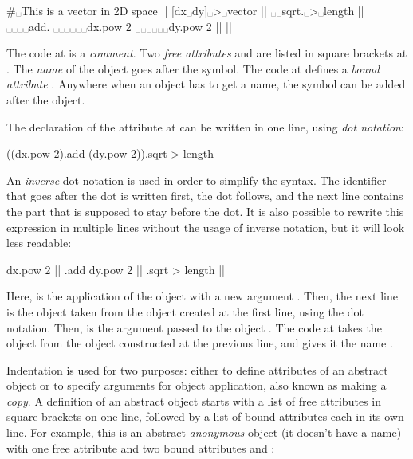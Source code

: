\begin{ffcode}
#␣This is a vector in 2D space |$\label{ln:comment}$|
[dx␣dy]␣>␣vector |$\label{ln:vector}$|
␣␣sqrt.␣>␣length |$\label{ln:length}$|
␣␣␣␣add.
␣␣␣␣␣␣dx.pow 2
␣␣␣␣␣␣dy.pow 2 |$\label{ln:length-end}$| |$\label{ln:vector-end}$|
\end{ffcode}

The code at  is a \emph{comment}.
Two \emph{free attributes}  and 
are listed in square brackets at .
The \emph{name} of the object goes after the \ff{>} symbol.
The code at  defines
a \emph{bound attribute} . Anywhere when an object
has to get a name, the \ff{>} symbol can be added after the object.

The declaration of the attribute  at 
can be written in one line, using \emph{dot notation}:

\begin{ffcode}
((dx.pow 2).add (dy.pow 2)).sqrt > length
\end{ffcode}

An \emph{inverse} dot notation is used in order to simplify
the syntax. The identifier that goes after the dot is written
first, the dot follows, and the next line contains the part
that is supposed to stay before the dot. It is also possible to rewrite
this expression in multiple lines without the usage of
inverse notation, but it will look less readable:

\begin{ffcode}
dx.pow 2 |$\label{ln:dx-pow}$|
.add
  dy.pow 2 |$\label{ln:dx-pow-2}$|
.sqrt > length |$\label{ln:dx-pow-3}$|
\end{ffcode}

Here,  is the application of the object  with
a new argument . Then, the next line is the object  taken
from the object created at the first line, using the dot notation. Then,
 is the argument passed to the object .
The code at  takes the object  from the object constructed
at the previous line, and gives it the name .

Indentation is used for two purposes: either to define attributes
of an abstract object or to specify arguments for object application, also
known as making a \emph{copy}.
A definition of an abstract object starts with a list of free attributes
in square brackets on one line, followed by a list of bound attributes
each in its own line. For example, this is an abstract \emph{anonymous} object
(it doesn't have a name)
with one free attribute  and two bound attributes  and :

